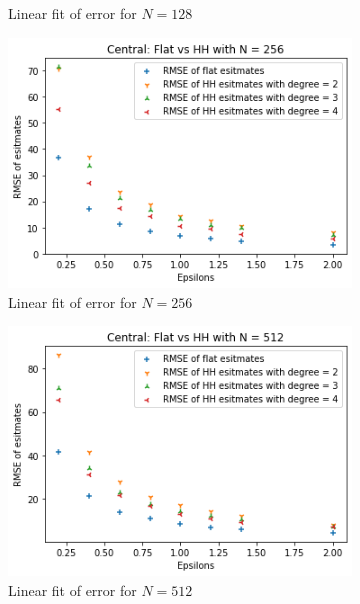 \documentclass[11pt]{article}
\theoremstyle{definition}
\begin{document}
\begin{figure}[H]
\begin{subfigure}{.4\textwidth}
  \caption{Linear fit of error for $N=128$}
  \label{fig:36}
\end{subfigure}
\begin{subfigure}{.4\textwidth}
  \centering
  \includegraphics[width=\linewidth]{figures/central_flat_hh/flat_beat_hh_N=256.png}
  \caption{Linear fit of error for $N=256$}
  \label{fig:37}
\end{subfigure}
\begin{subfigure}{.4\textwidth}
  \centering
  \includegraphics[width=\linewidth]{figures/central_flat_hh/flat_beat_hh_N=512.png}
  \caption{Linear fit of error for $N=512$}
  \label{fig:38}
\end{subfigure}%
\begin{subfigure}{.4\textwidth}
  \centering

\end{subfigure}
\end{figure}
\end{document}
